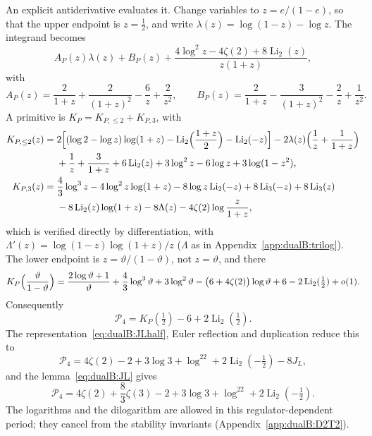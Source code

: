 \documentclass[11pt,a4paper]{article}
\numberwithin{equation}{section}
\newcommand{\Li}{\operatorname{Li}}
\begin{document}
An explicit antiderivative evaluates it. Change variables to $z=e/(1-e)$, so that the upper endpoint is $z=\frac12$,
and write $\lambda(z)=\log(1-z)-\log z$. The integrand becomes
\begin{equation}
 A_P(z)\lambda(z)+B_P(z)+\frac{4\log^2z-4\zeta(2)+8\Li_2(z)}{z(1+z)},
\end{equation}
with
\begin{equation}
 A_P(z)=\frac2{1+z}+\frac2{(1+z)^2}-\frac6z+\frac2{z^2},\qquad
 B_P(z)=\frac2{1+z}-\frac3{(1+z)^2}-\frac2z+\frac1{z^2}.
\end{equation}
A primitive is $K_P=K_{P,\le2}+K_{P,3}$, with
\begin{align}
 K_{P,\le2}(z)={}&2\Bigl[(\log2-\log z)\log(1+z)-\Li_2\Bigl(\frac{1+z}{2}\Bigr)-\Li_2(-z)\Bigr]
 -2\lambda(z)\Bigl(\frac1z+\frac1{1+z}\Bigr)\notag\\
 &+\frac1z+\frac3{1+z}+6\Li_2(z)+3\log^2z-6\log z+3\log(1-z^2),\\
 K_{P,3}(z)={}&\frac43\log^3z-4\log^2z\log(1+z)-8\log z\Li_2(-z)+8\Li_3(-z)+8\Li_3(z)\notag\\
 &-8\Li_2(z)\log(1+z)-8\Lambda(z)-4\zeta(2)\log\frac z{1+z},
\end{align}
which is verified directly by differentiation, with $\Lambda'(z)=\log(1-z)\log(1+z)/z$ ($\Lambda$ as in
Appendix~\ref{app:dualB:trilog}). The lower endpoint is $z=\vartheta/(1-\vartheta)$, not $z=\vartheta$, and there
\begin{equation}
 K_P\Bigl(\frac\vartheta{1-\vartheta}\Bigr)=\frac{2\log\vartheta+1}{\vartheta}+\frac43\log^3\vartheta+3\log^2\vartheta
 -\bigl(6+4\zeta(2)\bigr)\log\vartheta
 +6-2\Li_2(\tfrac12)+o(1).
\end{equation}
Consequently
\begin{equation}
 \mathcal P_4=K_P(\tfrac12)-6+2\Li_2(\tfrac12).
\end{equation}
The representation~\eqref{eq:dualB:JLhalf}, Euler reflection and duplication reduce this to
\begin{equation}
 \mathcal P_4=4\zeta(2)-2+3\log3+\log^22+2\Li_2(-\tfrac12)-8J_L,
\end{equation}
and the lemma~\eqref{eq:dualB:JL} gives
\begin{equation}
 \mathcal P_4=4\zeta(2)+\frac83\zeta(3)-2+3\log3+\log^22+2\Li_2(-\tfrac12).
 \label{eq:dualB:Pclosed}
\end{equation}
The logarithms and the dilogarithm are allowed in this regulator-dependent period; they cancel from the stability
invariants (Appendix~\ref{app:dualB:D2T2}).
\end{document}
